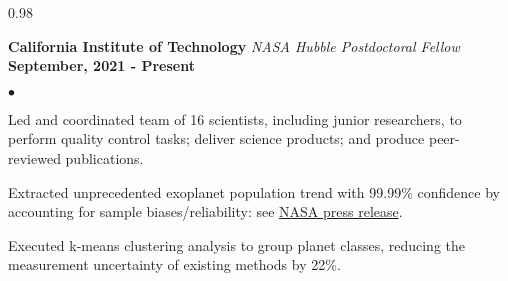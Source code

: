 \documentclass[margin,line, 12pt]{res}
\newenvironment{list2}{
  \begin{list}{$\bullet$}{%
      \setlength{\itemsep}{0.04in}
      \setlength{\parsep}{0.00in} \setlength{\parskip}{0in}
      \setlength{\topsep}{0.0in} \setlength{\partopsep}{0in}
      \setlength{\leftmargin}{0.2in}}}{\end{list}}
\begin{document}
\begin{spacing}{0.98}
\begin{resume}

\textbf{California Institute of Technology} \hfill \newline
\textit{NASA Hubble Postdoctoral Fellow} \hfill \textbf{September, 2021 - Present}\newline
    \begin{list2}
    	\vspace*{-5mm}
	
	\item Led and coordinated team of 16 scientists, including junior researchers, to perform quality control tasks; deliver science products; and produce peer-reviewed publications.
	
    	\item Extracted unprecedented exoplanet population trend with 99.99\% confidence by accounting for sample biases/reliability: see \href{https://exoplanets.nasa.gov/news/1768/discovery-alert-on-our-galaxys-outskirts-a-poverty-of-planets/}{NASA press release}.
	
	
	\item Executed k-means clustering analysis to group planet classes, reducing the measurement uncertainty of existing methods by 22\%. 
	

\end{list2}
\end{resume}
\end{spacing}
\end{document}

